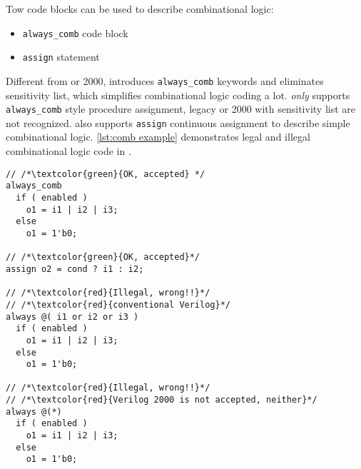 Tow code blocks can be used to describe combinational logic:
\begin{itemize}
\item \texttt{always\_comb} code block
\item \texttt{assign} statement
\end{itemize}
Different from \vlog{} or \vlog{} 2000, \sv{} introduces \texttt{always\_comb}
keywords and eliminates sensitivity list, which simplifies combinational logic 
coding a lot. \mhdl{} \emph{only} supports \texttt{always\_comb} style procedure
assignment, legacy \vlog{} or \vlog{} 2000 with sensitivity list are not recognized. 
\mhdl{} also supports \texttt{assign} continuous assignment to describe simple combinational
logic. \autoref{lst:comb example} demonstrates legal and illegal combinational logic code
in \mhdl{}.
\begin{lstlisting}[caption={Combinational logic examples}, label={lst:comb example}]
// /*\textcolor{green}{OK, accepted} */
always_comb 
  if ( enabled ) 
    o1 = i1 | i2 | i3;
  else 
    o1 = 1'b0;

// /*\textcolor{green}{OK, accepted}*/
assign o2 = cond ? i1 : i2;

// /*\textcolor{red}{Illegal, wrong!!}*/
// /*\textcolor{red}{conventional Verilog}*/
always @( i1 or i2 or i3 )
  if ( enabled ) 
    o1 = i1 | i2 | i3;
  else 
    o1 = 1'b0;

// /*\textcolor{red}{Illegal, wrong!!}*/
// /*\textcolor{red}{Verilog 2000 is not accepted, neither}*/
always @(*)
  if ( enabled ) 
    o1 = i1 | i2 | i3;
  else 
    o1 = 1'b0;
\end{lstlisting}
